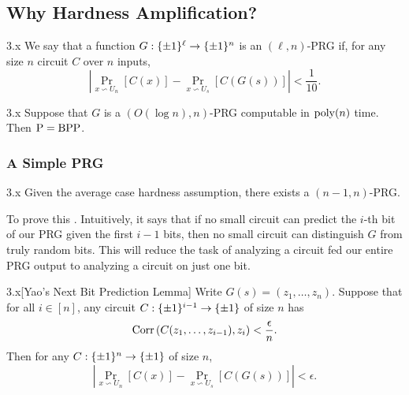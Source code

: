 \documentclass[11pt]{article}
\begin{document}
\subsection{Why Hardness Amplification?}

\begin{definition}{3.x}
    We say that a function $G : \{\pm 1\}^\ell \rightarrow \{\pm 1\}^{n}$ is an $(\ell, n)$-PRG if, for any size $n$ circuit $C$ over $n$ inputs, 
    \begin{equation*}
        \left|\Pr_{x \backsim U_n}[C(x)] - \Pr_{x \backsim U_s}[C(G(s))]\right| < \frac{1}{10}.
    \end{equation*}
\end{definition}

\begin{theorem}{3.x} Suppose that $G$ is a $(O(\log n), n)$-PRG computable in $\mathrm{poly}(n)$ time. Then $\mathrm{P} = \mathrm{BPP}$.
\end{theorem}

\subsubsection{A Simple PRG}

\begin{theorem}{3.x}
    Given the average case hardness assumption, there exists a $(n - 1, n)$-PRG.
\end{theorem}

To prove this . Intuitively, it says that if no small circuit can predict the $i$-th bit of our PRG given the first $i - 1$ bits, then no small circuit can distinguish $G$ from truly random bits. This will reduce the task of analyzing a circuit fed our entire PRG output to analyzing a circuit on just one bit.

\begin{lemma}{3.x}[Yao's Next Bit Prediction Lemma]
    Write $G(s) = (z_1, \ldots, z_n)$. Suppose that for all $i \in [n]$, any circuit $C : \{\pm 1\}^{i - 1} \rightarrow \{\pm 1\}$ of size $n$ has 
    \begin{equation*}
        \mathrm{Corr}\left(C(z_1, \ldots, z_{i - 1}), z_i\right) < \frac{\epsilon}{n}.
    \end{equation*}
    Then for any $C : \{\pm 1\}^n \rightarrow \{\pm 1\}$ of size $n$, 
    \begin{equation*}
        \left|\Pr_{x \backsim U_n}[C(x)] - \Pr_{x \backsim U_s}[C(G(s))]\right| < \epsilon.
    \end{equation*}
\end{lemma}
\end{document}
